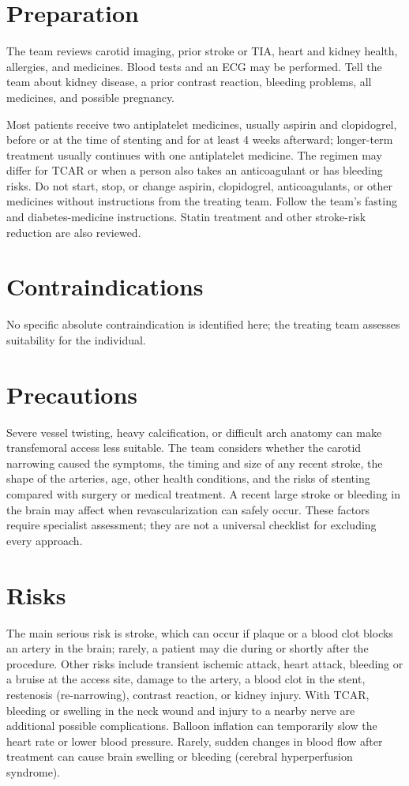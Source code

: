 \section*{Preparation}
The team reviews carotid imaging, prior stroke or TIA, heart and kidney health, allergies, and medicines. Blood tests and an ECG may be performed. Tell the team about kidney disease, a prior contrast reaction, bleeding problems, all medicines, and possible pregnancy.

Most patients receive two antiplatelet medicines, usually aspirin and clopidogrel, before or at the time of stenting and for at least 4 weeks afterward; longer-term treatment usually continues with one antiplatelet medicine. The regimen may differ for TCAR or when a person also takes an anticoagulant or has bleeding risks. Do not start, stop, or change aspirin, clopidogrel, anticoagulants, or other medicines without instructions from the treating team. Follow the team's fasting and diabetes-medicine instructions. Statin treatment and other stroke-risk reduction are also reviewed.

\section*{Contraindications}
No specific absolute contraindication is identified here; the treating team assesses suitability for the individual.

\section*{Precautions}
Severe vessel twisting, heavy calcification, or difficult arch anatomy can make transfemoral access less suitable. The team considers whether the carotid narrowing caused the symptoms, the timing and size of any recent stroke, the shape of the arteries, age, other health conditions, and the risks of stenting compared with surgery or medical treatment. A recent large stroke or bleeding in the brain may affect when revascularization can safely occur. These factors require specialist assessment; they are not a universal checklist for excluding every approach.

\section*{Risks}
The main serious risk is stroke, which can occur if plaque or a blood clot blocks an artery in the brain; rarely, a patient may die during or shortly after the procedure. Other risks include transient ischemic attack, heart attack, bleeding or a bruise at the access site, damage to the artery, a blood clot in the stent, restenosis (re-narrowing), contrast reaction, or kidney injury. With TCAR, bleeding or swelling in the neck wound and injury to a nearby nerve are additional possible complications. Balloon inflation can temporarily slow the heart rate or lower blood pressure. Rarely, sudden changes in blood flow after treatment can cause brain swelling or bleeding (cerebral hyperperfusion syndrome).

